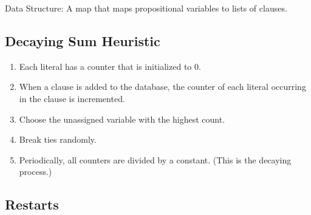 Data Structure: A map that maps propositional variables to lists of clauses.

\subsection{Decaying Sum Heuristic}
\begin{enumerate}
\item Each literal has a counter that is initialized to $0$.
\item When a clause is added to the database, the counter of each literal occurring in the clause
      is incremented.
\item Choose the unassigned variable with the highest count.
\item Break ties randomly.
\item Periodically, all counters are divided by a constant. (This is the decaying process.)
\end{enumerate}

\subsection{Restarts}

